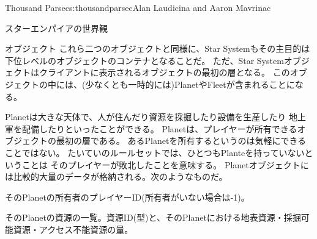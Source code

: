 \begin{aosachapter}{Thousand Parsec}{s:thousandparsec}{Alan Laudicina and Aaron Mavrinac}
\begin{aosasect1}{スターエンパイアの世界観}
\begin{aosasect2}{オブジェクト}
これら二つのオブジェクトと同様に、Star Systemもその主目的は下位レベルのオブジェクトのコンテナとなることだ。
ただ、Star Systemオブジェクトはクライアントに表示されるオブジェクトの最初の層となる。
このオブジェクトの中には、(少なくとも一時的には)PlanetやFleetが含まれることになる。

Planetは大きな天体で、人が住んだり資源を採掘したり設備を生産したり
地上軍を配備したりといったことができる。
Planetは、プレイヤーが所有できるオブジェクトの最初の層である。
あるPlanetを所有するというのは気軽にできることではない。
たいていのルールセットでは、ひとつもPlanteを持っていないということは
そのプレイヤーが敗北したことを意味する。
Planetオブジェクトには比較的大量のデータが格納される。次のようなものだ。

\begin{aosaitemize}

  \item そのPlanetの所有者のプレイヤーID(所有者がいない場合は-1)。

  \item そのPlanetの資源の一覧。資源ID(型)と、そのPlanetにおける地表資源・採掘可能資源・アクセス不能資源の量。

\end{aosaitemize}


\end{aosasect2}
\end{aosasect1}
\end{aosachapter}
